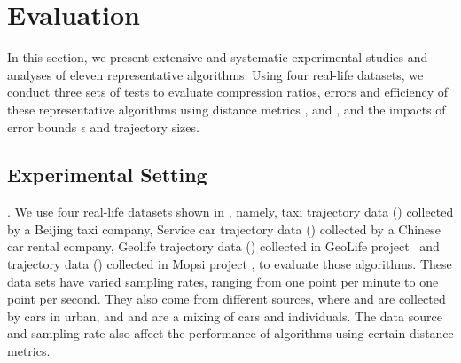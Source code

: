 \section{Evaluation} %
\label{sec-exp}
In this section, we present extensive and systematic experimental studies and analyses of eleven representative \lsa algorithms.
Using four real-life datasets, we conduct three sets of tests to evaluate compression ratios, errors and efficiency of these representative algorithms using distance metrics \ped, \sed and \dad, and the impacts of error bounds $\epsilon$ and trajectory sizes.
%

\subsection{Experimental Setting}

.
We use four real-life datasets shown in , namely, taxi trajectory data (\taxi) collected by a Beijing taxi company, Service car trajectory data (\ucar) collected by a Chinese car rental company, Geolife trajectory data (\geolife) collected in GeoLife project~\cite{Web:Geolife} and \mopsi trajectory data (\mopsi) collected in Mopsi project \cite{Web:Mopsi}, to evaluate those \lsa algorithms. These data sets have varied sampling rates, ranging from one point per minute to one point per second.
They also come from different sources, where \taxi and \ucar are collected by cars in urban, and \geolife and \mopsi are a mixing of cars and individuals. The data source and sampling rate also affect the performance of \lsa algorithms using certain distance metrics.

